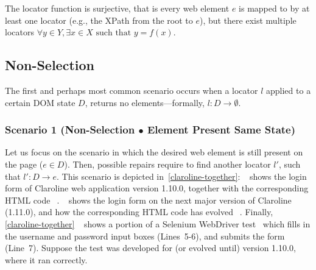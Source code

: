 The locator function is surjective, that is every web element $e$ is mapped to by at least one locator (e.g., the XPath from the root to $e$), but there exist multiple locators {$\displaystyle \forall y\in Y,\exists x\in X{\text{ such that }}y=f(x).$} 

%

\subsection{Non-Selection}\label{sec:nonselection}

The first and perhaps most common scenario occurs when a locator $l$ applied to a certain DOM state $D$, returns no elements---formally, $l: D \rightarrow \emptyset$. 
%

\subsubsection{Scenario 1 (Non-Selection $\bullet$ Element Present Same State)} 
Let us focus on the scenario in which the desired web element is still present on the page ($e \in D$). 
Then, possible repairs require to find another locator $l'$, such that $l': D \rightarrow e$.
This scenario is depicted in~\autoref{claroline-together}: \textcircled{}~shows the login form of Claroline web application version 1.10.0, together with the corresponding HTML code~\textcircled{}. \textcircled{}~shows the login form on the next major version of Claroline (1.11.0), and how the corresponding HTML code has evolved~\textcircled{}. 
Finally, \autoref{claroline-together}~\textcircled{} shows a portion of a Selenium WebDriver test~\cite{selenium} which fills in the username and password input boxes (Lines~5-6), and submits the form (Line~7). Suppose the test was developed for (or evolved until) version 1.10.0, where it ran correctly.

